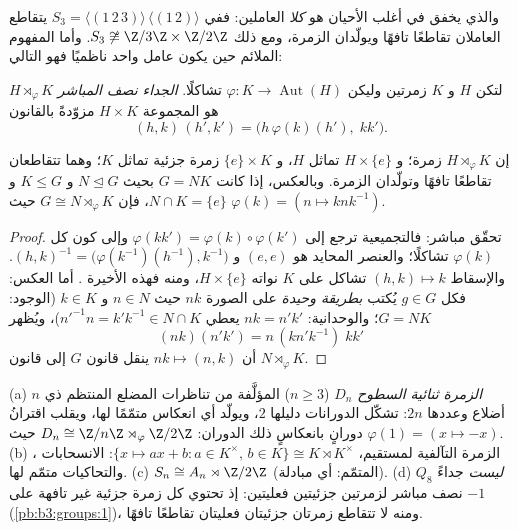 والذي يخفق في أغلب الأحيان هو  \emph{كلا} العاملين: ففي
$S_3
= \langle (1\,2\,3)\rangle \,\langle(1\,2)\rangle$ يتقاطع العاملان تقاطعًا تافهًا ويولّدان الزمرة، ومع
ذلك $S_3 \not\cong \Z/3\Z \times
\Z/2\Z$. وأما المفهوم الملائم حين يكون عامل واحد ناظميًا
فهو التالي:

\begin{definition}\label{def:b3:groups:semidirect}
لتكن $H$ و $K$ زمرتين وليكن $\varphi \colon K \to
\operatorname{Aut}(H)$ تشاكلًا. \emph{الجداء نصف
المباشر} $H \rtimes_\varphi K$ هو المجموعة $H \times K$
مزوّدةً بالقانون
\[
(h, k)\,(h', k') = \bigl(h\,\varphi(k)(h'),\; kk'\bigr).
\]
\end{definition}

\begin{proposition}\label{prop:b3:groups:semidirect}
إن $H \rtimes_\varphi K$ زمرة؛ و $H \times \{e\}$  تماثل
$H$، و $\{e\} \times K$ زمرة جزئية تماثل $K$؛ وهما تتقاطعان
تقاطعًا تافهًا وتولّدان الزمرة. وبالعكس، إذا كانت $G =
NK$ بحيث
$N \trianglelefteq G$ و $K \leq G$ و $N \cap K = \{e\}$، فإن $G \cong N \rtimes_\varphi K$ حيث $\varphi(k) = (n \mapsto
knk^{-1})$.
\end{proposition}

\begin{proof}
تحقّق مباشر: فالتجميعية ترجع إلى $\varphi(kk') =
\varphi(k)\circ\varphi(k')$ وإلى كون كل $\varphi(k)$
تشاكلًا؛ والعنصر المحايد هو $(e,e)$ و $(h,k)^{-1} =
\bigl(\varphi(k^{-1})(h^{-1}), k^{-1}\bigr)$. والإسقاط $(h,k)
\mapsto k$
تشاكل على $K$ نواته $H \times \{e\}$، ومنه فهذه الأخيرة .
أما العكس: فكل $g \in G$ يُكتب \emph{بطريقة وحيدة} على الصورة $nk$
حيث $n \in N$ و $k \in K$ (الوجود: $G =
NK$؛ والوحدانية: $nk = n'k'$
يعطي $n'^{-1}n = k'k^{-1} \in N \cap
K$)، ويُظهر
\[
(nk)(n'k') = n\,(kn'k^{-1})\;kk'
\]
أن $nk \mapsto (n, k)$ ينقل قانون $G$ إلى قانون $N \rtimes_\varphi K$.
\end{proof}

\begin{example}\label{ex:b3:groups:semidirectexamples}
(a) \emph{الزمرة ثنائية السطوح} $D_n$
($n \geq
3$) المؤلَّفة من تناظرات المضلع المنتظم ذي $n$ أضلاع وعددها
$2n$: تشكّل الدورانات  دليلها $2$، ويولّد أي
انعكاس متمّمًا لها، ويقلب اقترانُ دورانٍ بانعكاسٍ ذلك الدوران:
$D_n \cong \Z/n\Z \rtimes_\varphi \Z/2\Z$ حيث $\varphi(1) = (x
\mapsto -x)$.
(b) الزمرة التآلفية لمستقيم، $\{x \mapsto ax + b : a \in
K^\times,\, b \in K\} \cong K \rtimes K^\times$: الانسحابات ،
والتحاكيات متمّم لها.
(c) $S_n \cong A_n \rtimes \Z/2\Z$ (المتمّم: أي مبادلة).
(d)  $Q_8$ \emph{ليست} جداءً نصف مباشر لزمرتين
جزئيتين فعليتين: إذ تحتوي كل زمرة جزئية غير تافهة على $-1$
(\cref{pb:b3:groups:1})، ومنه لا تتقاطع زمرتان جزئيتان فعليتان تقاطعًا
تافهًا.
\end{example}

